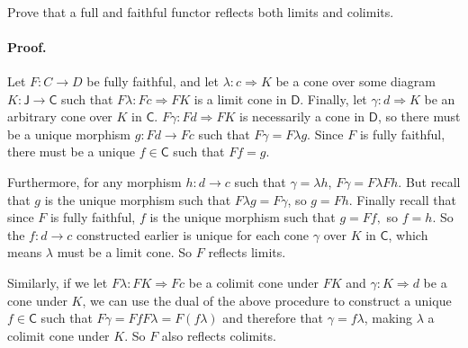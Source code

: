 \documentclass[main.tex]{subfiles}
\begin{document}
	
\paragraph{} 
\begin{exercise}
Prove that a full and faithful functor reflects both limits and colimits.
\end{exercise}

\paragraph{Proof.} 

Let $ F: C \to D $ be fully faithful, and let $ \lambda: c \Rightarrow K $ be a cone over some diagram $ K: \mathsf{J} \to \mathsf{C} $ such that $ F\lambda: Fc \Rightarrow FK $ is a limit cone in $ \mathsf{D} $. Finally, let $ \gamma: d \Rightarrow K $ be an arbitrary cone over $ K $ in $ \mathsf{C} $. $ F\gamma: Fd \Rightarrow FK $ is necessarily a cone in $ \mathsf{D} $, so there must be a unique morphism $ g: Fd \to Fc $ such that $ F\gamma = F\lambda g $. Since $ F $ is fully faithful, there must be a unique $ f \in \mathsf{C} $ such that $ Ff = g $.

Furthermore, for any morphism $ h: d \to c $ such that $ \gamma = \lambda h $, $ F\gamma = F\lambda Fh $. But recall that $ g $ is the unique morphism such that $ F\lambda g = F\gamma $, so $ g = Fh $. Finally recall that since $ F $ is fully faithful, $ f $ is the unique morphism such that $ g = Ff, $ so $ f = h. $ So the $ f: d \to c $ constructed earlier is unique for each cone $ \gamma $ over $ K $ in $ \mathsf{C} $, which means $ \lambda $ must be a limit cone. So $ F $ reflects limits.

Similarly, if we let $ F\lambda: FK \Rightarrow Fc $ be a colimit cone under $ FK $ and $ \gamma: K \Rightarrow d $ be a cone under $ K $, we can use the dual of the above procedure to construct a unique $ f \in \mathsf{C} $ such that $ F\gamma = FfF\lambda = F(f\lambda) $ and therefore that $ \gamma = f\lambda $, making $ \lambda $ a colimit cone under $ K $. So $ F $ also reflects colimits.
\end{document}
